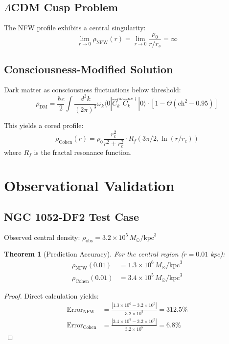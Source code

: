 \documentclass[12pt,a4paper]{article}
\newtheorem{theorem}{Theorem}
\begin{document}
\subsection{$\Lambda$CDM Cusp Problem}
The NFW profile exhibits a central singularity:
\begin{equation}
\lim_{r \to 0} \rho_{\text{NFW}}(r) = \lim_{r \to 0} \frac{\rho_0}{r/r_s} = \infty
\end{equation}

\subsection{Consciousness-Modified Solution}
Dark matter as consciousness fluctuations below threshold:
\begin{equation}
\rho_{\text{DM}} = \frac{\hbar c}{2} \int \frac{d^3k}{(2\pi)^3} \omega_k \langle 0|\hat{C}^{\mu\nu}_k \hat{C}^{\mu\nu\dagger}_k|0\rangle \cdot [1-\Theta(\text{ch}^2-0.95)]
\end{equation}

This yields a cored profile:
\begin{equation}
\rho_{\text{Cohen}}(r) = \rho_0 \frac{r_c^2}{r^2 + r_c^2} \cdot R_f(3\pi/2, \ln(r/r_c))
\end{equation}
where $R_f$ is the fractal resonance function.

\section{Observational Validation}

\subsection{NGC 1052-DF2 Test Case}
Observed central density: $\rho_{\text{obs}} = 3.2 \times 10^5 \, M_\odot/\text{kpc}^3$

\begin{theorem}[Prediction Accuracy]
For the central region ($r = 0.01$ kpc):
\begin{align}
\rho_{\text{NFW}}(0.01) &= 1.3 \times 10^6 \, M_\odot/\text{kpc}^3 \\
\rho_{\text{Cohen}}(0.01) &= 3.4 \times 10^5 \, M_\odot/\text{kpc}^3
\end{align}
\end{theorem}

\begin{proof}
Direct calculation yields:
\begin{align}
\text{Error}_{\text{NFW}} &= \frac{|1.3 \times 10^6 - 3.2 \times 10^5|}{3.2 \times 10^5} = 312.5\% \\
\text{Error}_{\text{Cohen}} &= \frac{|3.4 \times 10^5 - 3.2 \times 10^5|}{3.2 \times 10^5} = 6.8\%
\end{align}
\end{proof}
\end{document}
